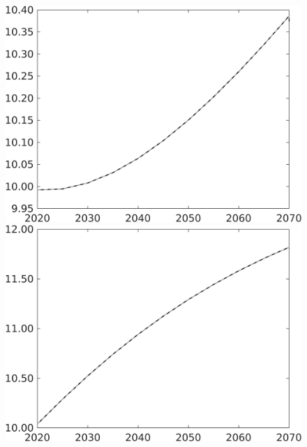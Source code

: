 \begin{figure}[h!!]
\begin{minipage}[]{0.32\textwidth}
\end{minipage}	
\begin{minipage}[]{0.32\textwidth}
\includegraphics[width=1\textwidth]{../../codding_model/own_basedOnFried/optimalPol_010922_revision/figures/all_13Sept22/CompTaul_Equlab_LFBAU_Reg0_gAf_spillover0_nsk1_xgr1_knspil0_sep1_countec0_GovRev1_etaa0.79_lgd0.png}
\end{minipage}	
\begin{minipage}[]{0.32\textwidth}
\includegraphics[width=1\textwidth]{../../codding_model/own_basedOnFried/optimalPol_010922_revision/figures/all_13Sept22/CompTaul_Equlab_LFBAU_Reg0_gAagg_spillover0_nsk1_xgr1_knspil0_sep1_countec0_GovRev1_etaa0.79_lgd0.png}

\end{minipage}
\end{figure}
